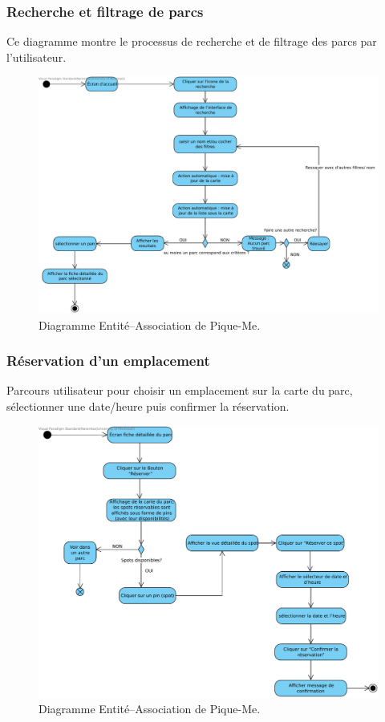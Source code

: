 \documentclass[12pt,a4paper]{article}
\begin{document}
\subsubsection{Recherche et filtrage de parcs}

Ce diagramme montre le processus de recherche et de filtrage des parcs par l'utilisateur.

\begin{figure}[h!]
  \centering
  \includegraphics[width=0.9\linewidth]{attachments/Recherche_Filtrage_Parcs.pdf}
  \caption{Diagramme Entité–Association de Pique-Me.}
\end{figure}

\subsubsection{Réservation d'un emplacement}

Parcours utilisateur pour choisir un emplacement sur la carte du parc, sélectionner une date/heure puis confirmer la réservation.

\begin{figure}[h!]
  \centering
  \includegraphics[width=0.9\linewidth]{attachments/Reservation_d_un_emplacement.pdf}
  \caption{Diagramme Entité–Association de Pique-Me.}
\end{figure}
\end{document}
